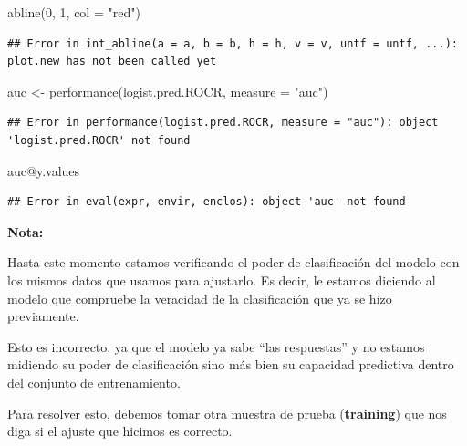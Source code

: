 \documentclass[
  12pt,
]{book}
\newenvironment{Shaded}{\begin{snugshade}}{\end{snugshade}}
\newcommand{\AttributeTok}[1]{\textcolor[rgb]{0.77,0.63,0.00}{#1}}
\newcommand{\DecValTok}[1]{\textcolor[rgb]{0.00,0.00,0.81}{#1}}
\newcommand{\FunctionTok}[1]{\textcolor[rgb]{0.00,0.00,0.00}{#1}}
\newcommand{\NormalTok}[1]{#1}
\newcommand{\OtherTok}[1]{\textcolor[rgb]{0.56,0.35,0.01}{#1}}
\newcommand{\SpecialCharTok}[1]{\textcolor[rgb]{0.00,0.00,0.00}{#1}}
\newcommand{\StringTok}[1]{\textcolor[rgb]{0.31,0.60,0.02}{#1}}
\begin{document}
\begin{Shaded}
\begin{Highlighting}[]
\FunctionTok{abline}\NormalTok{(}\DecValTok{0}\NormalTok{, }\DecValTok{1}\NormalTok{, }\AttributeTok{col =} \StringTok{"red"}\NormalTok{)}
\end{Highlighting}
\end{Shaded}

\begin{verbatim}
## Error in int_abline(a = a, b = b, h = h, v = v, untf = untf, ...): plot.new has not been called yet
\end{verbatim}

\begin{Shaded}
\begin{Highlighting}[]
\NormalTok{auc }\OtherTok{\textless{}{-}} \FunctionTok{performance}\NormalTok{(logist.pred.ROCR, }\AttributeTok{measure =} \StringTok{"auc"}\NormalTok{)}
\end{Highlighting}
\end{Shaded}

\begin{verbatim}
## Error in performance(logist.pred.ROCR, measure = "auc"): object 'logist.pred.ROCR' not found
\end{verbatim}

\begin{Shaded}
\begin{Highlighting}[]
\NormalTok{auc}\SpecialCharTok{@}\NormalTok{y.values}
\end{Highlighting}
\end{Shaded}

\begin{verbatim}
## Error in eval(expr, envir, enclos): object 'auc' not found
\end{verbatim}

\textbf{Nota:}

Hasta este momento estamos verificando el poder de clasificación del
modelo con los mismos datos que usamos para ajustarlo. Es decir, le
estamos diciendo al modelo que compruebe la veracidad de la
clasificación que ya se hizo previamente.

Esto es incorrecto, ya que el modelo ya sabe ``las respuestas'' y no
estamos midiendo su poder de clasificación sino más bien su capacidad
predictiva dentro del conjunto de entrenamiento.

Para resolver esto, debemos tomar otra muestra de prueba
(\textbf{training}) que nos diga si el ajuste que hicimos es correcto.
\end{document}
